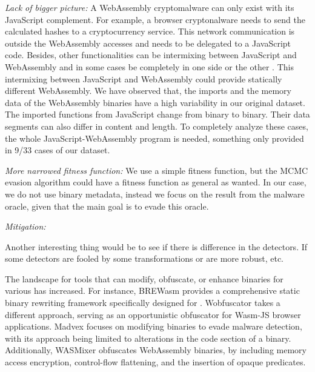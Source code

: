\emph{Lack of bigger picture:} A WebAssembly cryptomalware can only exist with its JavaScript complement.
For example, a browser cryptonalware needs to send the calculated hashes to a cryptocurrency service.
This network communication is outside the WebAssembly accesses and needs to be delegated to a JavaScript code.
Besides, other functionalities can be intermixing between JavaScript and WebAssembly and in some cases be completely in one side or the other \cite{romano2022wobfuscator}.
This intermixing between JavaScript and WebAssembly could provide statically different WebAssembly. 
We have observed that, the imports and the memory data of the WebAssembly binaries have a high variability in our original dataset.
The imported functions from JavaScript change from binary to binary.
Their data segments can also differ in content and length.
To completely analyze these cases, the whole JavaScript-WebAssembly program is needed, something only provided in 9/33 cases of our dataset.

\emph{More narrowed fitness function:} We use a simple fitness function, but the MCMC evasion algorithm could have a fitness function as general as wanted.
In our case, we do not use binary metadata, instead we focus on the result from the malware oracle, given that the main goal is to evade this oracle.

\emph{Mitigation: } 


Another interesting thing would be to see if there is difference in the detectors. If some detectors are fooled by some transformations or are more robust, etc.


 The landscape for tools that can modify, obfuscate, or enhance \Wasm binaries for various has increased. 
For instance, BREWasm \cite{BREWasm} provides a comprehensive static binary rewriting framework specifically designed for \Wasm. 
Wobfuscator \cite{wobfuscator} takes a different approach, serving as an opportunistic obfuscator for Wasm-JS browser applications. 
Madvex \cite{madvex} focuses on modifying \Wasm binaries to evade malware detection, with its approach being limited to alterations in the code section of a \Wasm binary. 
Additionally, WASMixer \cite{wasmixer} obfuscates WebAssembly binaries, by including memory access encryption, control-flow flattening, and the insertion of opaque predicates.


